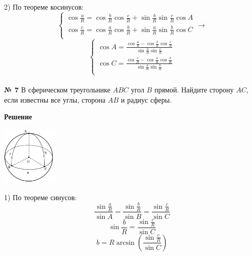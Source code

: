     2) По теореме косинусов:
    \[
        \begin{cases}
            \cos\frac{a}{R} = \cos\frac{b}{R}\cos\frac{c}{R} + \sin\frac{b}{R}\sin\frac{c}{R}\cos A\\
            \cos\frac{c}{R} = \cos\frac{a}{R}\cos\frac{b}{R} + \sin\frac{a}{R}\sin\frac{b}{R}\cos C\\
        \end{cases}
        \rightarrow
    \]
    \[
        \begin{cases}
            \cos A = \frac{\cos\frac{a}{R} - \cos\frac{b}{R}\cos\frac{c}{R}}{\sin\frac{b}{R}\sin\frac{c}{R}}\\
            \cos C = \frac{\cos\frac{c}{R} - \cos\frac{a}{R}\cos\frac{b}{R}}{\sin\frac{a}{R}\sin\frac{b}{R}}\\
        \end{cases}
    \]\\


    \textbf{№ 7}
    В сферическом треугольнике $ABC$ угол $B$ прямой.
    Найдите сторону $AC$, если известны все углы, сторона $AB$ и радиус сферы.

    \textbf{Решение}\\

    \begin{center}
        \includegraphics[width=0.2\textwidth]{images/img9}\\
    \end{center}

    1) По теореме синусов:
    \[
        \frac{\sin\frac{a}{R}}{\sin A} = \frac{\sin\frac{b}{R}}{\sin B} = \frac{\sin\frac{c}{R}}{\sin C}
    \]
    \[
        \sin\frac{b}{R} = \frac{\sin\frac{c}{R}}{\sin C}
    \]
    \[
        b = R\arcsin\left(\frac{\sin\frac{c}{R}}{\sin C}\right)
    \]


